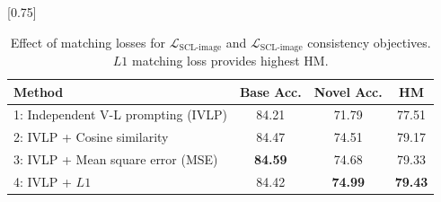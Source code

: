 \begin{table}[t!]
    \small \centering
 \setlength{\tabcolsep}{7pt}
    \scalebox{0.75}[0.75]{
    \begin{tabular}{lccc}
    \toprule
    Method  & Base Acc. & Novel Acc. & HM \\
    \midrule
    1: Independent V-L prompting (IVLP) & 84.21 & 71.79 & 77.51 \\
    2: IVLP + Cosine similarity & 84.47	&74.51	&79.17 \\
    3: IVLP + Mean square error (MSE)  & \textbf{84.59}&	74.68 &	79.33 \\
     \rowcolor{tabhighlight} 4: IVLP + $L1$  & 84.42 & \textbf{74.99} & \textbf{79.43} \\
    \bottomrule
    \end{tabular}}
    \caption{Effect of matching losses for $\mathcal{L}_\text{SCL-image}$ and $\mathcal{L}_\text{SCL-image}$ consistency objectives. $L1$ matching loss provides highest HM.}
    \label{table:matching_loss_ablations}
\end{table}